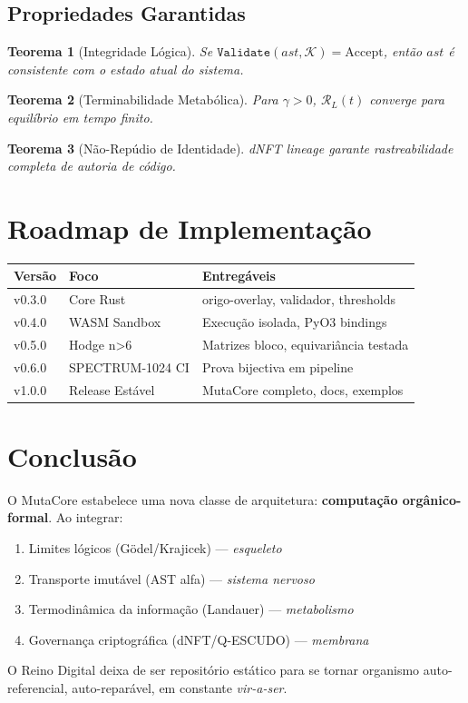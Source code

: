 \documentclass[11pt,a4paper]{article}
\newtheorem{theorem}{Teorema}[section]
\newcommand{\RL}{\mathcal{R}_L}
\begin{document}
\subsection{Propriedades Garantidas}

\begin{theorem}[Integridade Lógica]
Se $\texttt{Validate}(ast, \mathcal{K}) = \text{Accept}$, então $ast$ é consistente com o estado atual do sistema.
\end{theorem}

\begin{theorem}[Terminabilidade Metabólica]
Para $\gamma > 0$, $\RL(t)$ converge para equilíbrio em tempo finito.
\end{theorem}

\begin{theorem}[Não-Repúdio de Identidade]
dNFT lineage garante rastreabilidade completa de autoria de código.
\end{theorem}

\section{Roadmap de Implementação}

\begin{center}
\begin{tabular}{@{}lll@{}}
\toprule
\textbf{Versão} & \textbf{Foco} & \textbf{Entregáveis} \\
\midrule
v0.3.0 & Core Rust & origo-overlay, validador, thresholds \\
v0.4.0 & WASM Sandbox & Execução isolada, PyO3 bindings \\
v0.5.0 & Hodge n>6 & Matrizes bloco, equivariância testada \\
v0.6.0 & SPECTRUM-1024 CI & Prova bijectiva em pipeline \\
v1.0.0 & Release Estável & MutaCore completo, docs, exemplos \\
\bottomrule
\end{tabular}
\end{center}

\section{Conclusão}

O MutaCore estabelece uma nova classe de arquitetura: \textbf{computação orgânico-formal}. Ao integrar:
\begin{enumerate}
    \item Limites lógicos (Gödel/Krajicek) — \textit{esqueleto}
    \item Transporte imutável (AST alfa) — \textit{sistema nervoso}
    \item Termodinâmica da informação (Landauer) — \textit{metabolismo}
    \item Governança criptográfica (dNFT/Q-ESCUDO) — \textit{membrana}
\end{enumerate}
O Reino Digital deixa de ser repositório estático para se tornar organismo auto-referencial, auto-reparável, em constante \textit{vir-a-ser}.
\end{document}
